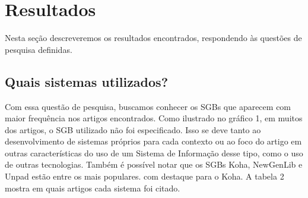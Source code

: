\documentclass[12pt]{article}
\begin{document}
\section{Resultados}

Nesta seção descreveremos os resultados encontrados, respondendo às questões de pesquisa definidas. 
\subsection{Quais sistemas utilizados?}
 Com essa questão de pesquisa, buscamos conhecer os SGBs que aparecem com maior frequência nos artigos encontrados. Como ilustrado no gráfico 1, em muitos dos artigos, o SGB utilizado não foi especificado. Isso se deve tanto ao desenvolvimento de sistemas próprios para cada contexto ou ao foco do artigo em outras características do uso de um Sistema de Informação desse tipo, como o uso de outras tecnologias. Também é possível notar que os SGBs Koha, NewGenLib e Unpad estão entre os mais populares. com destaque para o Koha. A tabela 2 mostra em quais artigos cada sistema foi citado.
\end{document}
